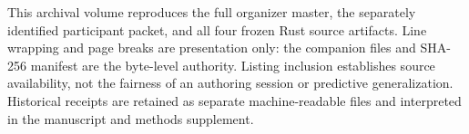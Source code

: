 \documentclass[10pt]{article}
\begin{document}
\noindent This archival volume reproduces the full organizer master, the separately
identified participant packet, and all four frozen Rust source artifacts. Line wrapping
and page breaks are presentation only: the companion files and SHA-256 manifest are
the byte-level authority. Listing inclusion establishes source availability, not the
fairness of an authoring session or predictive generalization. Historical receipts
are retained as separate machine-readable files and interpreted in the manuscript
and methods supplement.
\tableofcontents
\clearpage

\end{document}

